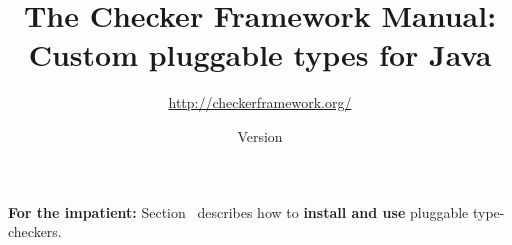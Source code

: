 \documentclass[10pt]{report}
\title{The Checker Framework Manual: \\ Custom pluggable types for Java}
\author{\url{http://checkerframework.org/}}
\date{Version \ReleaseInfo{}}
\begin{document}
\maketitle



\setcounter{page}{2}


\noindent
\textbf{For the impatient:}
Section~
describes how to \textbf{install and use} pluggable type-checkers.

\tableofcontents
\newpage




















% 















\htmlhr


\end{document}
